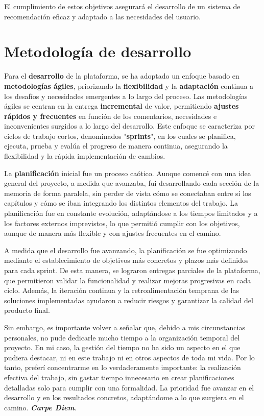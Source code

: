 El cumplimiento de estos objetivos asegurará el desarrollo de un sistema de recomendación eficaz y adaptado a las necesidades del usuario.
\newpage
\section{Metodología de desarrollo}

Para el \textbf{desarrollo} de la plataforma, se ha adoptado un enfoque basado en \textbf{metodologías ágiles}, priorizando la \textbf{flexibilidad} y la \textbf{adaptación} continua a los desafíos y necesidades emergentes a lo largo del proceso. Las metodologías ágiles se centran en la entrega \textbf{incremental} de valor, permitiendo \textbf{ajustes rápidos y frecuentes} en función de los comentarios, necesidades e inconvenientes surgidos a lo largo del desarrollo. Este enfoque se caracteriza por ciclos de trabajo cortos, denominados "\textbf{sprints}", en los cuales se planifica, ejecuta, prueba y evalúa el progreso de manera continua, asegurando la flexibilidad y la rápida implementación de cambios.

La \textbf{planificación} inicial fue un proceso caótico. Aunque comencé con una idea general del proyecto, a medida que avanzaba, fui desarrollando cada sección de la memoria de forma paralela, sin perder de vista cómo se conectaban entre sí los capítulos y cómo se iban integrando los distintos elementos del trabajo. La planificación fue en constante evolución, adaptándose a los tiempos limitados y a los factores externos imprevistos, lo que permitió cumplir con los objetivos, aunque de manera más flexible y con ajustes frecuentes en el camino.

A medida que el desarrollo fue avanzando, la planificación se fue optimizando mediante el establecimiento de objetivos más concretos y plazos más definidos para cada sprint. De esta manera, se lograron entregas parciales de la plataforma, que permitieron validar la funcionalidad y realizar mejoras progresivas en cada ciclo. Además, la iteración continua y la retroalimentación temprana de las soluciones implementadas ayudaron a reducir riesgos y garantizar la calidad del producto final.

Sin embargo, es importante volver a señalar que, debido a mis circunstancias personales, no pude dedicarle mucho tiempo a la organización temporal del proyecto. En mi caso, la gestión del tiempo no ha sido un aspecto en el que pudiera destacar, ni en este trabajo ni en otros aspectos de toda mi vida. Por lo tanto, preferí concentrarme en lo verdaderamente importante: la realización efectiva del trabajo, sin gastar tiempo innecesario en crear planificaciones detalladas solo para cumplir con una formalidad. La prioridad fue avanzar en el desarrollo y en los resultados concretos, adaptándome a lo que surgiera en el camino. \textit{\textbf{Carpe Diem}}.


